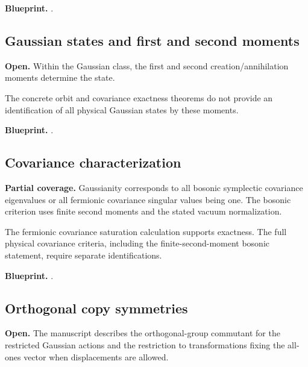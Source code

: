 \textbf{Blueprint.} .

\subsection{Gaussian states and first and second moments}\label{paper:gaussian-moments}
\textbf{Open.} Within the Gaussian class, the first and second creation/annihilation moments determine the state. 

The concrete orbit and covariance exactness theorems do not provide an identification of all physical Gaussian states by these moments.

\textbf{Blueprint.} .

\subsection{Covariance characterization}\label{paper:covariance-criterion}
\textbf{Partial coverage.} Gaussianity corresponds to all bosonic symplectic covariance eigenvalues or all fermionic covariance singular values being one. The bosonic criterion uses finite second moments and the stated vacuum normalization. 

The fermionic covariance saturation calculation supports exactness. The full physical covariance criteria, including the finite-second-moment bosonic statement, require separate identifications.


\textbf{Blueprint.} .

\subsection{Orthogonal copy symmetries}\label{paper:copy-symmetry}
\textbf{Open.} The manuscript describes the orthogonal-group commutant for the restricted Gaussian actions and the restriction to transformations fixing the all-ones vector when displacements are allowed. 

